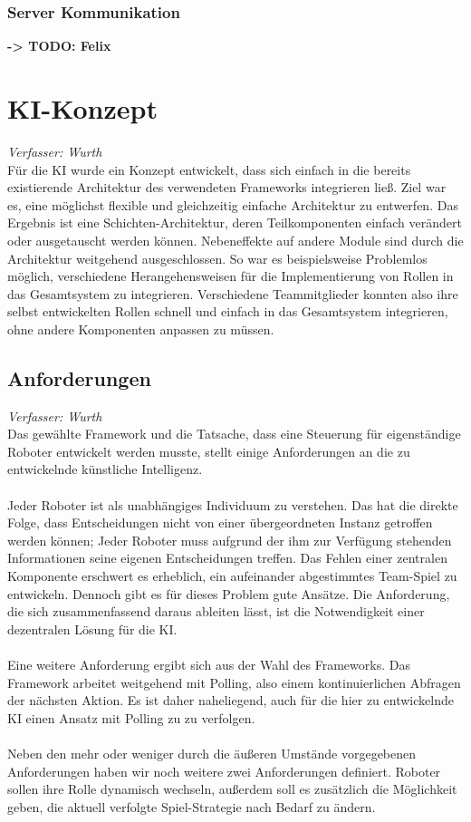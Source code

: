 \documentclass[fontsize=12pt,a4paper,final]{scrartcl}[2003/01/01]
\begin{document}
\subsubsection{Server Kommunikation}
\textbf{-> TODO: Felix}

\section{KI-Konzept}
\textit{Verfasser: Wurth}\\

Für die KI wurde ein Konzept entwickelt, dass sich einfach in die bereits existierende Architektur des verwendeten Frameworks integrieren ließ. Ziel war es, eine möglichst flexible und gleichzeitig einfache Architektur zu entwerfen. Das Ergebnis ist eine Schichten-Architektur, deren Teilkomponenten einfach verändert oder ausgetauscht werden können. Nebeneffekte auf andere Module sind durch die Architektur weitgehend ausgeschlossen. So war es beispielsweise Problemlos möglich, verschiedene Herangehensweisen für die Implementierung von Rollen in das Gesamtsystem zu integrieren. Verschiedene Teammitglieder konnten also ihre selbst entwickelten Rollen schnell und einfach in das Gesamtsystem integrieren, ohne andere Komponenten anpassen zu müssen.

\subsection{Anforderungen}
\textit{Verfasser: Wurth}\\

Das gewählte Framework und die Tatsache, dass eine Steuerung für eigenständige Roboter entwickelt werden musste, stellt einige Anforderungen an die zu entwickelnde künstliche Intelligenz.\\
\\
Jeder Roboter ist als unabhängiges Individuum zu verstehen. Das hat die direkte Folge, dass Entscheidungen nicht von einer übergeordneten Instanz getroffen werden können; Jeder Roboter muss aufgrund der ihm zur Verfügung stehenden Informationen seine eigenen Entscheidungen treffen. Das Fehlen einer zentralen Komponente erschwert es erheblich, ein aufeinander abgestimmtes Team-Spiel zu entwickeln. Dennoch gibt es für dieses Problem gute Ansätze. Die Anforderung, die sich zusammenfassend daraus ableiten lässt, ist die Notwendigkeit einer dezentralen Lösung für die KI.\\
\\
Eine weitere Anforderung ergibt sich aus der Wahl des Frameworks. Das Framework arbeitet weitgehend mit Polling, also einem kontinuierlichen Abfragen der nächsten Aktion. Es ist daher naheliegend, auch für die hier zu entwickelnde KI einen Ansatz mit Polling zu zu verfolgen.\\
\\
Neben den mehr oder weniger durch die äußeren Umstände vorgegebenen Anforderungen haben wir noch weitere zwei Anforderungen definiert. Roboter sollen ihre Rolle dynamisch wechseln, außerdem soll es zusätzlich die Möglichkeit geben, die aktuell verfolgte Spiel-Strategie nach Bedarf zu ändern.
\end{document}
